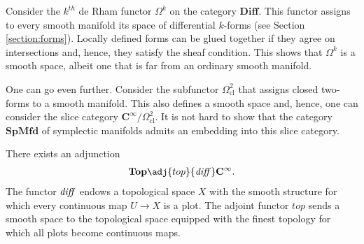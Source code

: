     \begin{example}
        Consider the $k^{th}$ de Rham functor $\Omega^k$ on the category $\mathbf{Diff}$. This functor assigns to every smooth manifold its space of differential $k$-forms (see Section \ref{section:forms}). Locally defined forms can be glued together if they agree on intersections and, hence, they satisfy the sheaf condition. This shows that $\Omega^k$ is a smooth space, albeit one that is far from an ordinary smooth manifold.

        One can go even further. Consider the subfunctor $\Omega^2_\mathrm{cl}$ that assigns closed two-forms to a smooth manifold. This also defines a smooth space and, hence, one can consider the slice category $\mathbf{C^\infty}/\Omega^2_\mathrm{cl}$. It is not hard to show that the category $\mathbf{SpMfd}$ of symplectic manifolds admits an embedding into this slice category.
    \end{example}

    \begin{property}
        There exists an adjunction
        \begin{gather}
            \mathbf{Top}\adj{top}{\text{\textit{diff}}}\mathbf{C^\infty}.
        \end{gather}
        The functor $\text{\textit{diff}}$ endows a topological space $X$ with the smooth structure for which every continuous map $U\rightarrow X$ is a plot. The adjoint functor $top$ sends a smooth space to the topological space equipped with the finest topology for which all plots become continuous maps.
    \end{property}

